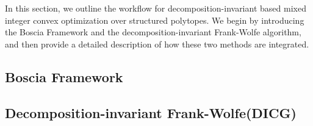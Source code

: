 In this section, we outline the workflow for decomposition-invariant based mixed integer convex optimization over structured polytopes. We begin by introducing the Boscia Framework and the decomposition-invariant Frank-Wolfe algorithm, and then provide a detailed description of how these two methods are integrated.

\subsection{Boscia Framework}


\subsection{Decomposition-invariant Frank-Wolfe(DICG)}